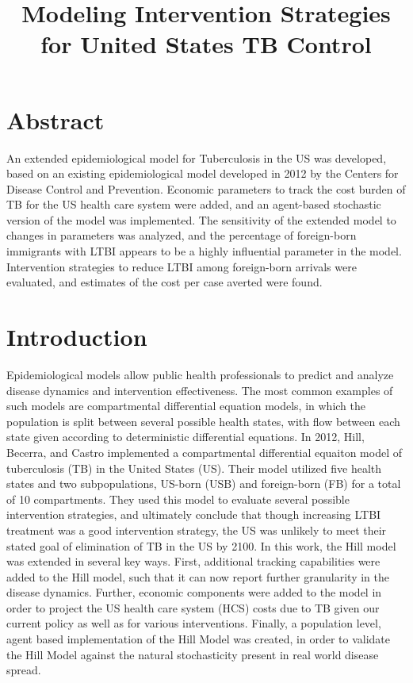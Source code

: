 \documentclass{amsart}
\title{Modeling Intervention Strategies for United States TB Control}
\begin{document}
\maketitle

\section{Abstract}
An extended epidemiological model for Tuberculosis in the US was developed, based on an existing
epidemiological model developed in 2012 by the Centers for Disease Control and Prevention.  
Economic parameters to track the cost burden of TB for the US health care system were added,
and an agent-based stochastic version of the model was implemented.  The sensitivity of the extended
model to changes in parameters was analyzed, and the percentage of foreign-born immigrants with
LTBI appears to be a highly influential parameter in the model.  Intervention strategies to reduce LTBI
among foreign-born arrivals were evaluated, and estimates of the cost per case averted were found.  

\section{Introduction}
Epidemiological models allow public health professionals to predict and analyze
disease dynamics and intervention effectiveness. The most common examples of
such models are compartmental differential equation models, in which the
population is split between several possible health states, with flow between
each state given according to deterministic differential equations. In 2012, 
Hill, Becerra, and Castro implemented a compartmental
differential equaiton model of tuberculosis (TB) in the United States (US).
Their model utilized five health states and two subpopulations, US-born (USB)
and foreign-born (FB) for a total of 10 compartments. They used this model to
evaluate several possible intervention strategies, and ultimately conclude that
though increasing LTBI treatment was a good intervention strategy, the US was
unlikely to meet their stated goal of elimination of TB in the US by 2100. In
this work, the Hill model was extended in several key ways. First, additional
tracking capabilities were added to the Hill model, such that it can now report
further granularity in the disease dynamics. Further, economic components were
added to the model in order to project the US health care system (HCS) costs due
to TB given our current policy as well as for various interventions. Finally, a
population level, agent based implementation of the Hill Model was created, in
order to validate the Hill Model against the natural stochasticity present in
real world disease spread. 
\end{document}
